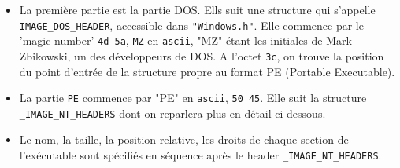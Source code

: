 \documentclass{book}
\newcommand{\code}[1]{\texttt{#1}}
\newcommand{\Windows}{{\sc windows}}
\begin{document}
\medskip
\noindent
{}


\begin{itemize}
	\item La première partie est la partie DOS. Ells suit une structure qui s'appelle \code{IMAGE\_DOS\_HEADER}, accessible dans \code{"Windows.h"}. Elle commence par le 'magic number' \code{4d 5a}, \code{MZ} en \code{ascii}, "MZ" étant les initiales de Mark Zbikowski, un des développeurs de DOS.  A l'octet \code{3c}, on trouve la position du point d'entrée de la structure propre au format PE (Portable Executable).
	\item La partie \code{PE} commence par "PE" en \code{ascii}, \code{50 45}. Elle suit la structure \code{\_IMAGE\_NT\_HEADERS} dont on reparlera plus en détail ci-dessous.
	\item Le nom, la taille, la position relative, les droits de chaque section de l'exécutable sont spécifiés en séquence  après le header \code{\_IMAGE\_NT\_HEADERS}. 
\end{itemize}
\end{document}
